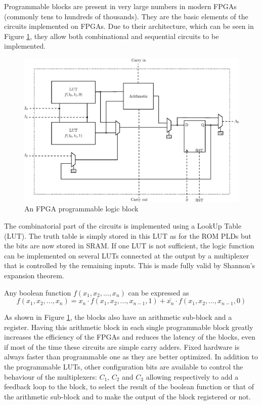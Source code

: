 Programmable blocks are present in very large numbers in modern FPGAs (commonly tens to hundreds of 
thousands). They are the basic elements of the circuits implemented on FPGAs. Due to their 
architecture, which can be seen in Figure \ref{fig:fpga/fpga_block}, they allow both combinational 
and sequential circuits to be implemented. 

\begin{figure}[H]
    \centering
    \includegraphics[scale=0.8]{Chapter1-Hardware/res/fpga_block}
    \caption{An FPGA programmable logic block}
    \label{fig:fpga/fpga_block}
\end{figure}

The combinatorial part of the circuits is implemented using a LookUp Table (LUT). The truth table is 
simply stored in this LUT as for the ROM PLDs but the bits are now stored in SRAM. If one LUT is 
not sufficient, the logic function can be implemented on several LUTs connected at the output by a 
multiplexer that is controlled by the remaining inputs. This is made fully valid by Shannon's 
expansion theorem. 

\begin{theorem}
    Any boolean function $f(x_1, x_2, ..., x_n)$ can be expressed as 
    \begin{equation*}
        f(x_1, x_2, ..., x_n) = x_n \cdot f(x_1, x_2, ..., x_{n - 1}, 1) + \bar{x_n} \cdot 
        f(x_1, x_2, ..., x_{n - 1}, 0)
    \end{equation*}
\end{theorem}

As shown in Figure \ref{fig:fpga/fpga_block}, the blocks also have an arithmetic sub-block and a 
register. Having this arithmetic block in each single programmable block greatly increases the 
efficiency of the FPGAs and reduces the latency of the blocks, even if most of the time these circuits are 
simple carry adders. Fixed hardware is always faster than programmable one as they are better 
optimized. In addition to the programmable LUTs, other configuration bits are available to control
the behaviour of the multiplexers: $C_1$, $C_2$ and $C_3$ allowing respectively to add a feedback 
loop to the block, to select the result of the boolean function or that of the arithmetic sub-block 
and to make the output of the block registered or not.

